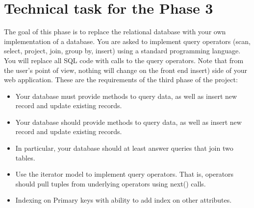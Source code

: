 \documentclass[12pt,a4paper]{article}
\begin{document}
\section{Technical task for the Phase 3}
The goal of this phase is to replace the relational database with your own implementation of a database. You are asked to implement query operators (scan, select, project, join, group by, insert) using a standard programming language. You will replace all SQL code with calls to the query operators.
Note that from the user’s point of view, nothing will change on the front end insert) side of your web application. These are the requirements of the third phase of the project:
\begin{itemize}
\item Your database must provide methods to query data, as well as insert new record and update existing records.
\item Your database should provide methods to query data, as well as insert new record and update existing records.
\item In particular, your database should at least answer queries that join two tables.
\item Use the iterator model to implement query operators. That is, operators should pull tuples from underlying operators using next() calls.
\item Indexing on Primary keys with ability to add index on other attributes.
\end{itemize}
\end{document}
